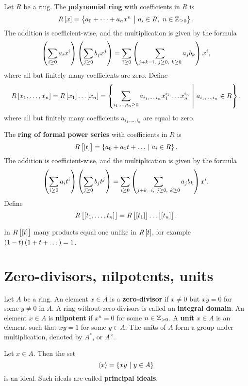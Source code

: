 
\begin{definition}
Let $ R $ be a ring. The \textbf{polynomial ring} with coefficients in $ R $ is
$$ R\sbr{x} = \cbr{a_0 + \dots + a_nx^n \st a_i \in R, \ n \in \ZZ_{\ge 0}}. $$
The addition is coefficient-wise, and the multiplication is given by the formula
$$ \br{\sum_{i \ge 0} a_ix^i}\br{\sum_{j \ge 0} b_jx^j} = \sum_{i \ge 0} \br{\sum_{j + k = i, \ j \ge 0, \ k \ge 0} a_jb_k}x^i, $$
where all but finitely many coefficients are zero. Define
$$ R\sbr{x_1, \dots, x_n} = R\sbr{x_1} \dots \sbr{x_n} = \cbr{\sum_{i_1, \dots, i_n \ge 0} a_{i_1, \dots, i_n}x_1^{i_1} \dots x_n^{i_n} \st a_{i_1, \dots, i_n} \in R}, $$
where all but finitely many coefficients $ a_{i_1, \dots, i_n} $ are equal to zero.
\end{definition}

\begin{definition}
The \textbf{ring of formal power series} with coefficients in $ R $ is
$$ R\sbr{\sbr{t}} = \cbr{a_0 + a_1t + \dots \st a_i \in R}. $$
The addition is coefficient-wise, and the multiplication is given by the formula
$$ \br{\sum_{i \ge 0} a_it^i}\br{\sum_{j \ge 0} b_jt^j} = \sum_{i \ge 0} \br{\sum_{j + k = i, \ j \ge 0, \ k \ge 0} a_jb_k}x^i. $$
Define
$$ R\sbr{\sbr{t_1, \dots, t_n}} = R\sbr{\sbr{t_1}} \dots \sbr{\sbr{t_n}}. $$
\end{definition}

In $ R\sbr{\sbr{t}} $ many products equal one unlike in $ R\sbr{t} $, for example $ \br{1 - t}\br{1 + t + \dots} = 1 $.

\section{Zero-divisors, nilpotents, units}

\begin{definition}
Let $ A $ be a ring. An element $ x \in A $ is a \textbf{zero-divisor} if $ x \ne 0 $ but $ xy = 0 $ for some $ y \ne 0 $ in $ A $. A ring without zero-divisors is called an \textbf{integral domain}. An element $ x \in A $ is \textbf{nilpotent} if $ x^n = 0 $ for some $ n \in \mathbb{Z}_{> 0} $. A \textbf{unit} $ x \in A $ is an element such that $ xy = 1 $ for some $ y \in A $. The units of $ A $ form a group under multiplication, denoted by $ A^* $, or $ A^\times $.
\end{definition}

\begin{definition}
Let $ x \in A $. Then the set
$$ \abr{x} = \cbr{xy \st y \in A} $$
is an ideal. Such ideals are called \textbf{principal ideals}.
\end{definition}

